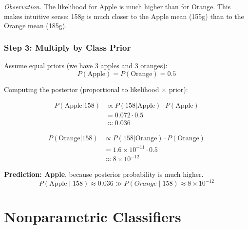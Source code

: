\documentclass[a4paper]{article}
\theoremstyle{definition}
\begin{document}
\emph{Observation.} The likelihood for Apple is much higher than for Orange.
This makes intuitive sense: 158g is much closer to the Apple mean (155g) than
to the Orange mean (185g).

\subsubsection{Step 3: Multiply by Class Prior}

Assume equal priors (we have 3 apples and 3 oranges):
\[
P(\text{Apple}) = P(\text{Orange}) = 0.5
\]

Computing the posterior (proportional to likelihood $\times$ prior):

\begin{align}
P(\text{Apple}|158) &\propto P(158|\text{Apple}) \cdot P(\text{Apple}) \\
&= 0.072 \cdot 0.5 \\
&\approx 0.036
\end{align}

\begin{align}
P(\text{Orange}|158) &\propto P(158|\text{Orange}) \cdot P(\text{Orange}) \\
&= 1.6 \times 10^{-11} \cdot 0.5 \\
&\approx 8 \times 10^{-12}
\end{align}
\begin{tcolorbox}[
    colback=magenta!15!white,
    colframe=magenta!15!white,
    boxrule=0pt,
    arc=0pt,
    halign=center
]
    \textbf{Prediction: Apple}, because posterior probability is much higher.
    \[
      P(\text{Apple}\mid158) \approx 0.036 \gg P(Orange\mid158) \approx 8 \times 10^{-12}
    \]
\end{tcolorbox}
\section{Nonparametric Classifiers}
\end{document}
